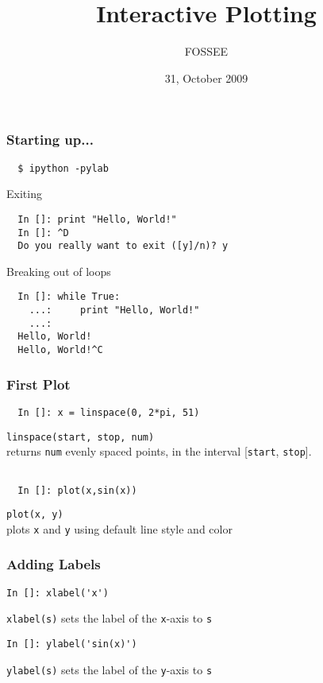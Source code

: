 \documentclass[14pt,compress]{beamer}
\title[]{Interactive Plotting}
\author[FOSSEE] {FOSSEE}
\institute[IIT Bombay] {Department of Aerospace Engineering\\IIT Bombay}
\date[] {31, October 2009}
\newcommand{\typ}[1]{\lstinline{#1}}
\begin{document}
\begin{frame}
  \maketitle
\end{frame}



\begin{frame}[fragile]
\frametitle{Starting up...}
\begin{verbatim}
  $ ipython -pylab  
\end{verbatim}
Exiting
\begin{lstlisting}     
  In []: print "Hello, World!"
  In []: ^D
  Do you really want to exit ([y]/n)? y
\end{lstlisting}
Breaking out of loops
\begin{lstlisting}     
  In []: while True:
    ...:     print "Hello, World!"
    ...:     
  Hello, World!
  Hello, World!^C
\end{lstlisting}
\end{frame}

\begin{frame}[fragile]
\frametitle{First Plot}
\begin{lstlisting}
  In []: x = linspace(0, 2*pi, 51)
\end{lstlisting}
\typ{linspace(start, stop, num)} \\
returns \typ{num} evenly spaced points, in the interval [\typ{start}, \typ{stop}].
\begin{lstlisting}

  In []: plot(x,sin(x))
\end{lstlisting}
\typ{plot(x, y)}\\
plots \typ{x} and \typ{y} using default line style and color
\end{frame}

\begin{frame}[fragile]
\frametitle{Adding Labels}
  \begin{lstlisting}
In []: xlabel('x')
  \end{lstlisting}
\typ{xlabel(s)} sets the label of the \typ{x}-axis to \typ{s}

  \begin{lstlisting}
In []: ylabel('sin(x)')
  \end{lstlisting}
\typ{ylabel(s)} sets the label of the \typ{y}-axis to \typ{s}
\end{frame}
\end{document}
